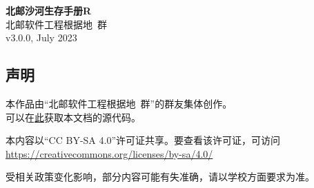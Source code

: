 \documentclass[a4paper]{article}
\begin{document}


\begin{titlepage}
    \centering
    {\Huge\rmfamily\bfseries 北邮沙河生存手册R} \\[6.5ex]
    {\Large\sffamily 北邮软件工程根据地\ 群} \\
    {\large\ttfamily v3.0.0, July 2023}\\[1.5ex]
\end{titlepage}

\newpage
\begin{center}
\section*{声明}

本作品由“北邮软件工程根据地\ 群”的群友集体创作。\\
可以在\href{https://github.com/BUPTSE/welcome}{此}获取本文档的源代码。

\smallskip

本内容以“CC BY-SA 4.0”许可证共享。要查看该许可证，可访问\\
\href{https://creativecommons.org/licenses/by-sa/4.0/}{https://creativecommons.org/licenses/by-sa/4.0/}

\smallskip

受相关政策变化影响，部分内容可能有失准确，请以学校方面要求为准。

\bigskip

\end{center}

\newpage
\setcounter{page}{1}
\tableofcontents

\newpage
\setcounter{page}{1}

\pagestyle{fancy}
\lhead{\small \leftmark}
\chead{}
\lfoot{}
\cfoot{\thepage}
\rfoot{}
\renewcommand{\headrulewidth}{0.4pt}




















\end{document}

